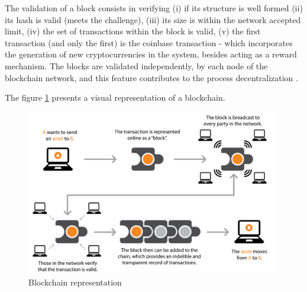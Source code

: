 The validation of a block consists in verifying (i) if its structure is well formed (ii) its hash is valid (meets the challenge), (iii) its size is within the network accepted limit, (iv) the set of transactions within the block is valid, (v) the first transaction (and only the first) is the coinbase transaction - which incorporates the generation of new cryptocurrencies in the system, besides acting as a reward mechanism. The blocks are validated independently, by each node of the blockchain network, and this feature contributes to the process decentralization \cite{greve2018blockchain}.

The figure \ref{fig:blockchain} presents a visual representation of a blockchain.

\begin{figure}[htbp]
\begin{center}
  \includegraphics[scale=0.35]{images/blockchain.png}
\caption{Blockchain representation \cite{michael2018blockchain}}
\label{fig:blockchain}
\end{center}
\end{figure}
